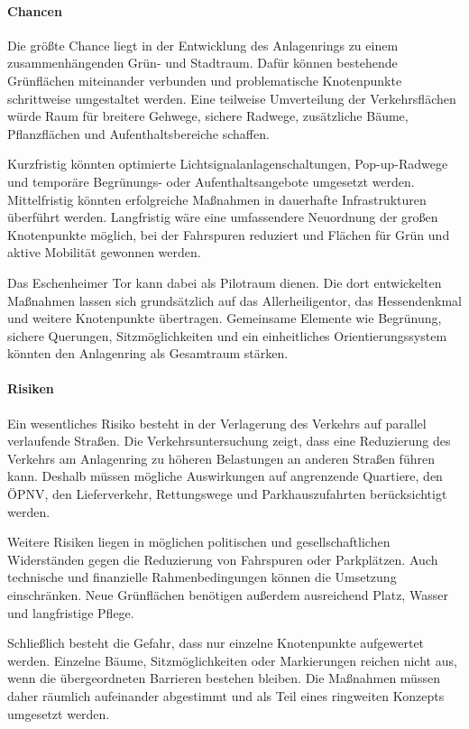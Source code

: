\documentclass[a4paper,12pt]{article}
\begin{document}
\paragraph{Chancen}

Die größte Chance liegt in der Entwicklung des Anlagenrings zu einem zusammenhängenden Grün- und Stadtraum. Dafür können bestehende Grünflächen miteinander verbunden und problematische Knotenpunkte schrittweise umgestaltet werden. Eine teilweise Umverteilung der Verkehrsflächen würde Raum für breitere Gehwege, sichere Radwege, zusätzliche Bäume, Pflanzflächen und Aufenthaltsbereiche schaffen.

Kurzfristig könnten optimierte Lichtsignalanlagenschaltungen, Pop-up-Radwege und temporäre Begrünungs- oder Aufenthaltsangebote umgesetzt werden. Mittelfristig könnten erfolgreiche Maßnahmen in dauerhafte Infrastrukturen überführt werden. Langfristig wäre eine umfassendere Neuordnung der großen Knotenpunkte möglich, bei der Fahrspuren reduziert und Flächen für Grün und aktive Mobilität gewonnen werden.

Das Eschenheimer Tor kann dabei als Pilotraum dienen. Die dort entwickelten Maßnahmen lassen sich grundsätzlich auf das Allerheiligentor, das Hessendenkmal und weitere Knotenpunkte übertragen. Gemeinsame Elemente wie Begrünung, sichere Querungen, Sitzmöglichkeiten und ein einheitliches Orientierungssystem könnten den Anlagenring als Gesamtraum stärken.

\paragraph{Risiken}

Ein wesentliches Risiko besteht in der Verlagerung des Verkehrs auf parallel verlaufende Straßen. Die Verkehrsuntersuchung zeigt, dass eine Reduzierung des Verkehrs am Anlagenring zu höheren Belastungen an anderen Straßen führen kann. Deshalb müssen mögliche Auswirkungen auf angrenzende Quartiere, den ÖPNV, den Lieferverkehr, Rettungswege und Parkhauszufahrten berücksichtigt werden.

Weitere Risiken liegen in möglichen politischen und gesellschaftlichen Widerständen gegen die Reduzierung von Fahrspuren oder Parkplätzen. Auch technische und finanzielle Rahmenbedingungen können die Umsetzung einschränken. Neue Grünflächen benötigen außerdem ausreichend Platz, Wasser und langfristige Pflege.

Schließlich besteht die Gefahr, dass nur einzelne Knotenpunkte aufgewertet werden. Einzelne Bäume, Sitzmöglichkeiten oder Markierungen reichen nicht aus, wenn die übergeordneten Barrieren bestehen bleiben. Die Maßnahmen müssen daher räumlich aufeinander abgestimmt und als Teil eines ringweiten Konzepts umgesetzt werden.
\end{document}
